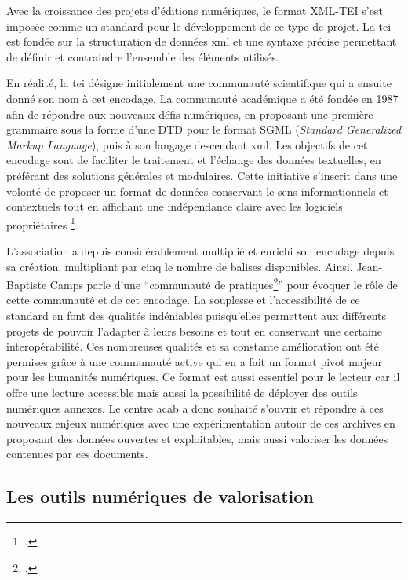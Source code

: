 	Avec la croissance des projets d'éditions numériques, le format XML-TEI s'est imposée comme un standard pour le développement de ce type de projet. La \gls{tei} est fondée sur la structuration de données \gls{xml} et une syntaxe précise permettant de définir et contraindre l'ensemble des éléments utilisés.
	
	En réalité, la \gls{tei} désigne initialement une communauté scientifique qui a ensuite donné son nom à cet encodage. La communauté académique a été fondée en 1987 afin de répondre aux nouveaux défis numériques, en proposant une première grammaire sous la forme d'une \gls{DTD} pour le format SGML (\textit{Standard Generalized Markup Language}), puis à son langage descendant \gls{xml}. Les objectifs de cet encodage sont de faciliter le traitement et l'échange des données textuelles, en préférant des solutions générales et modulaires. Cette initiative s'inscrit dans une volonté de proposer un format de données conservant le sens informationnels et contextuels tout en affichant une indépendance claire avec les logiciels propriétaires \footcite[Lou Burnard, \enquote{Introduction} \textit{in}][]{burnardQuEstceQue2015}.
	
	L'association a depuis considérablement multiplié et enrichi son encodage depuis sa création, multipliant par cinq le nombre de balises disponibles. Ainsi, Jean-Baptiste Camps parle d'une \enquote{communauté de pratiques\footcite{campsTEICommunautePratiques2017}} pour évoquer le rôle de cette communauté et de cet encodage. La souplesse et l'accessibilité de ce standard en font des qualités indéniables puisqu'elles permettent aux différents projets de pouvoir l'adapter à leurs besoins et tout en conservant une certaine interopérabilité. Ces nombreuses qualités et sa constante amélioration ont été permises grâce à  une communauté active qui en a fait un format pivot majeur pour les humanités numériques. Ce format est aussi essentiel pour le lecteur car il offre une lecture accessible mais aussi la possibilité de déployer des outils numériques annexes. Le centre \gls{acab} a donc souhaité s'ouvrir et répondre à ces nouveaux enjeux numériques avec une expérimentation autour de ces archives en proposant des données ouvertes et exploitables, mais aussi valoriser les données contenues par ces documents. 
	
	\subsection{Les outils numériques de valorisation}
	

